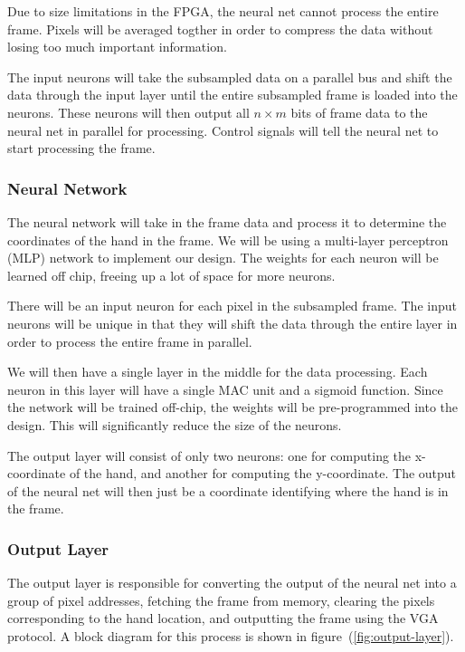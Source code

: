 \documentclass[10pt]{article}
\begin{document}
Due to size limitations in the FPGA, the neural net cannot process the entire
frame. Pixels will be averaged togther in order to compress the data without
losing too much important information. 

The input neurons will take the subsampled data on a parallel bus and shift the
data through the input layer until the entire subsampled frame is loaded into
the neurons. These neurons will then output all $n \times m$ bits of frame data
to the neural net in parallel for processing. Control signals will tell the
neural net to start processing the frame.

\subsubsection{Neural Network}
\label{ssub:neural_network}

The neural network will take in the frame data and process it to determine the
coordinates of the hand in the frame. We will be using a multi-layer perceptron
(MLP) network to implement our design. The weights for each neuron will be
learned off chip, freeing up a lot of space for more neurons.

There will be an input neuron for each pixel in the subsampled frame. The input
neurons will be unique in that they will shift the data through the entire layer
in order to process the entire frame in parallel.

We will then have a single layer in the middle for the data processing. Each
neuron in this layer will have a single MAC unit and a sigmoid function. Since
the network will be trained off-chip, the weights will be pre-programmed into
the design. This will significantly reduce the size of the neurons.

The output layer will consist of only two neurons: one for computing the
x-coordinate of the hand, and another for computing the y-coordinate. The output
of the neural net will then just be a coordinate identifying where the hand is
in the frame.

\subsubsection{Output Layer}
\label{ssub:output_layer}

The output layer is responsible for converting the output of the neural net into
a group of pixel addresses, fetching the frame from memory, clearing the pixels
corresponding to the hand location, and outputting the frame using the VGA
protocol. A block diagram for this process is shown in
figure~(\ref{fig:output-layer}).
\end{document}
